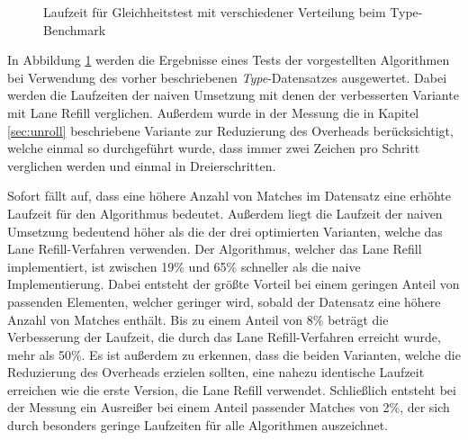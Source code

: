 \begin{figure}[]
	\centering
	\caption{Laufzeit für Gleichheitstest mit verschiedener Verteilung beim Type-Benchmark}
	\label{fig:type_equals}
\end{figure}

In Abbildung \ref{fig:type_equals} werden die Ergebnisse eines Tests der vorgestellten Algorithmen bei Verwendung des vorher beschriebenen \emph{Type}-Datensatzes ausgewertet.
Dabei werden die Laufzeiten der naiven Umsetzung mit denen der verbesserten Variante mit Lane Refill verglichen.
Außerdem wurde in der Messung die in Kapitel \ref{sec:unroll} beschriebene Variante zur Reduzierung des Overheads berücksichtigt, welche einmal so durchgeführt wurde, dass immer zwei Zeichen pro Schritt verglichen werden und einmal in Dreierschritten.

Sofort fällt auf, dass eine höhere Anzahl von Matches im Datensatz eine erhöhte Laufzeit für den Algorithmus bedeutet.
Außerdem liegt die Laufzeit der naiven Umsetzung bedeutend höher als die der drei optimierten Varianten, welche das Lane Refill-Verfahren verwenden.
Der Algorithmus, welcher das Lane Refill implementiert, ist zwischen 19\% und 65\% schneller als die naive Implementierung.
Dabei entsteht der größte Vorteil bei einem geringen Anteil von passenden Elementen, welcher geringer wird, sobald der Datensatz eine höhere Anzahl von Matches enthält.
Bis zu einem Anteil von 8\% beträgt die Verbesserung der Laufzeit, die durch das Lane Refill-Verfahren erreicht wurde, mehr als 50\%.
Es ist außerdem zu erkennen, dass die beiden Varianten, welche die Reduzierung des Overheads erzielen sollten, eine nahezu identische Laufzeit erreichen wie die erste Version, die Lane Refill verwendet.
Schließlich entsteht bei der Messung ein Ausreißer bei einem Anteil passender Matches von 2\%, der sich durch besonders geringe Laufzeiten für alle Algorithmen auszeichnet.

